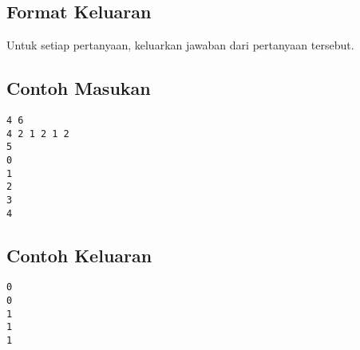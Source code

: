 \documentclass{article}
\begin{document}
\subsection*{Format Keluaran}

Untuk setiap pertanyaan, keluarkan jawaban dari pertanyaan tersebut.

\begin{multicols}{2}
\subsection*{Contoh Masukan}
\begin{lstlisting}
4 6
4 2 1 2 1 2
5
0
1
2
3
4
\end{lstlisting}
\columnbreak
\subsection*{Contoh Keluaran}
\begin{lstlisting}
0
0
1
1
1
\end{lstlisting}
\vfill
\null
\end{multicols}

\pagebreak
\end{document}
